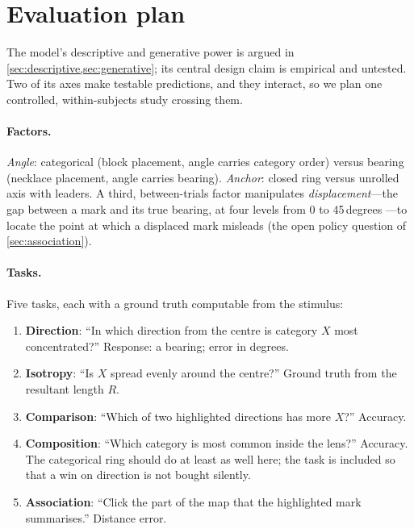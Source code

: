 \section{Evaluation plan}
\label{sec:evaluation}


The model's descriptive and generative power is argued in
\cref{sec:descriptive,sec:generative}; its central design claim is empirical and
untested. Two of its axes make testable predictions, and they interact, so we
plan one controlled, within-subjects study crossing them.

\paragraph{Factors.} \emph{Angle}: categorical (block placement, angle
carries category order) versus bearing (necklace placement, angle carries
bearing). \emph{Anchor}: closed ring versus unrolled axis with leaders. A third,
between-trials factor manipulates \emph{displacement}---the gap between a
mark and its true bearing, at four levels from 0 to 45\,degrees
---to locate the point at which a displaced
mark misleads (the open policy question of \cref{sec:association}).

\paragraph{Tasks.} Five tasks, each with a ground truth computable from the
stimulus:
\begin{enumerate}[leftmargin=*, itemsep=1pt]
  \item \textbf{Direction}: ``In which direction from the centre is category
    $X$ most concentrated?'' Response: a bearing; error in degrees.
  \item \textbf{Isotropy}: ``Is $X$ spread evenly around the centre?''
    Ground truth from the resultant length $R$.
  \item \textbf{Comparison}: ``Which of two highlighted directions has more
    $X$?'' Accuracy.
  \item \textbf{Composition}: ``Which category is most common inside the
    lens?'' Accuracy. The categorical ring should do at least as well here;
    the task is included so that a win on direction is not bought silently.
  \item \textbf{Association}: ``Click the part of the map that the highlighted
    mark summarises.'' Distance error.
\end{enumerate}

